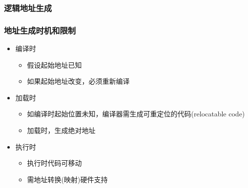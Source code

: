\begin{frame}[plain,t]
    
    \frametitle{逻辑地址生成}
    \begin{figure}
        \centering
    \end{figure}
    
\end{frame}
\begin{frame}[plain,t]
    \frametitle{地址生成时机和限制}
	\begin{itemize}
	    \item 编译时
	    \begin{itemize}
	        \item 假设起始地址已知
	        \item 如果起始地址改变，必须重新编译
	    \end{itemize}
	    \item 加载时
	    \begin{itemize}
	        \item 如编译时起始位置未知，编译器需生成可重定位的代码(relocatable code) 
	        \item 加载时，生成绝对地址
	    \end{itemize}
	    \item 执行时
	    \begin{itemize}
	        \item 执行时代码可移动
	        \item 需地址转换(映射)硬件支持
	    \end{itemize}
	\end{itemize}    
\end{frame}
